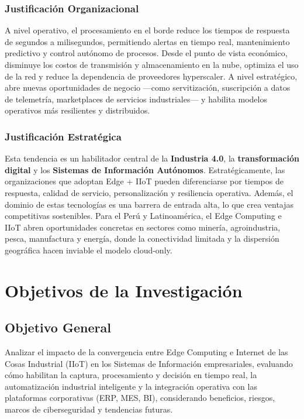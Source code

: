 ﻿\documentclass[12pt,a4paper,oneside]{article}
\begin{document}
\subsubsection{Justificación Organizacional}

A nivel operativo, el procesamiento en el borde reduce los tiempos de respuesta de segundos a milisegundos, permitiendo alertas en tiempo real, mantenimiento predictivo y control autónomo de procesos. Desde el punto de vista económico, disminuye los costos de transmisión y almacenamiento en la nube, optimiza el uso de la red y reduce la dependencia de proveedores hyperscaler. A nivel estratégico, abre nuevas oportunidades de negocio ---como servitización, suscripción a datos de telemetría, marketplaces de servicios industriales--- y habilita modelos operativos más resilientes y distribuidos.

\subsubsection{Justificación Estratégica}

Esta tendencia es un habilitador central de la \textbf{Industria 4.0}, la \textbf{transformación digital} y los \textbf{Sistemas de Información Autónomos}. Estratégicamente, las organizaciones que adoptan Edge + IIoT pueden diferenciarse por tiempos de respuesta, calidad de servicio, personalización y resiliencia operativa. Además, el dominio de estas tecnologías es una barrera de entrada alta, lo que crea ventajas competitivas sostenibles. Para el Perú y Latinoamérica, el Edge Computing e IIoT abren oportunidades concretas en sectores como minería, agroindustria, pesca, manufactura y energía, donde la conectividad limitada y la dispersión geográfica hacen inviable el modelo cloud-only.

\section{Objetivos de la Investigación}

\subsection{Objetivo General}

Analizar el impacto de la convergencia entre Edge Computing e Internet de las Cosas Industrial (IIoT) en los Sistemas de Información empresariales, evaluando cómo habilitan la captura, procesamiento y decisión en tiempo real, la automatización industrial inteligente y la integración operativa con las plataformas corporativas (ERP, MES, BI), considerando beneficios, riesgos, marcos de ciberseguridad y tendencias futuras.
\end{document}
